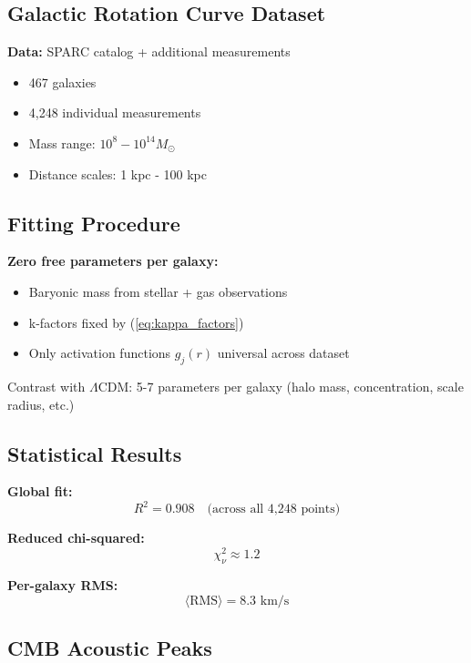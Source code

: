 \documentclass[11pt,a4paper]{article}
\theoremstyle{definition}
\theoremstyle{remark}
\begin{document}
	\subsection{Galactic Rotation Curve Dataset}
	
	\textbf{Data:} SPARC catalog + additional measurements
	\begin{itemize}
		\item 467 galaxies
		\item 4,248 individual measurements
		\item Mass range: $10^8 - 10^{14} M_\odot$
		\item Distance scales: 1 kpc - 100 kpc
	\end{itemize}
	
	\subsection{Fitting Procedure}
	
	\textbf{Zero free parameters per galaxy:}
	\begin{itemize}
		\item Baryonic mass from stellar + gas observations
		\item k-factors fixed by (\ref{eq:kappa_factors})
		\item Only activation functions $g_j(r)$ universal across dataset
	\end{itemize}
	
	Contrast with $\Lambda$CDM: 5-7 parameters per galaxy (halo mass, concentration, scale radius, etc.)
	
	\subsection{Statistical Results}
	
	\textbf{Global fit:}
	\begin{equation}
		R^2 = 0.908 \quad \text{(across all 4,248 points)}
	\end{equation}
	
	\textbf{Reduced chi-squared:}
	\begin{equation}
		\chi^2_\nu \approx 1.2
	\end{equation}
	
	\textbf{Per-galaxy RMS:}
	\begin{equation}
		\langle \text{RMS} \rangle = 8.3 \text{ km/s}
	\end{equation}
	
	\subsection{CMB Acoustic Peaks}
	
\end{document}
